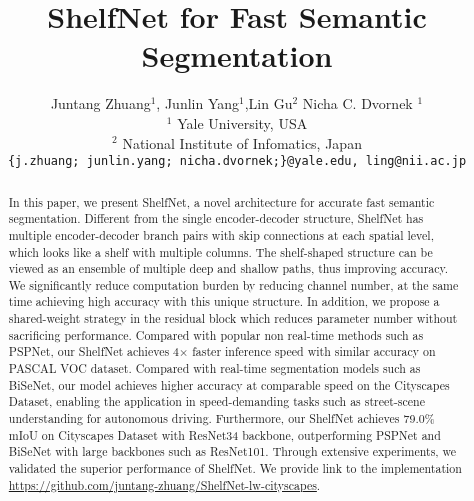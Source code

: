 \documentclass[10pt,twocolumn,letterpaper]{article}
\begin{document}
\title{ShelfNet for Fast Semantic Segmentation}
\author{Juntang Zhuang$^1$, \quad Junlin Yang$^1$,\quad  Lin Gu$^2$ \quad Nicha C. Dvornek $^{1}$\\
$^{1}$ Yale University, USA  \\ $^{2}$ National Institute of Infomatics, Japan \\
{\tt\small \{j.zhuang; junlin.yang; nicha.dvornek;\}@yale.edu, ling@nii.ac.jp}
}

\maketitle



\begin{abstract}
In this paper, we present ShelfNet, a novel architecture for accurate fast semantic segmentation. Different from the single encoder-decoder structure, ShelfNet has multiple encoder-decoder branch pairs with skip connections at each spatial level, which looks like a shelf with multiple columns. The shelf-shaped structure can be viewed as an ensemble of multiple deep and shallow paths, thus improving accuracy. We significantly reduce computation burden by reducing channel number, at the same time achieving high accuracy with this unique structure. In addition, we propose a shared-weight strategy in the residual block which reduces parameter number without sacrificing performance. Compared with popular non real-time methods such as PSPNet, our ShelfNet achieves 4$\times$ faster inference speed with similar accuracy on PASCAL VOC dataset. Compared with real-time segmentation models such as BiSeNet, our model achieves higher accuracy at comparable speed on the Cityscapes Dataset, enabling the application in speed-demanding tasks such as street-scene understanding for autonomous driving. Furthermore, our ShelfNet achieves 79.0\% mIoU on Cityscapes Dataset with ResNet34 backbone, outperforming PSPNet and BiSeNet with large backbones such as ResNet101. Through extensive experiments, we validated the superior performance of ShelfNet. We provide link to the implementation \url{https://github.com/juntang-zhuang/ShelfNet-lw-cityscapes}.
\end{abstract}
\end{document}
